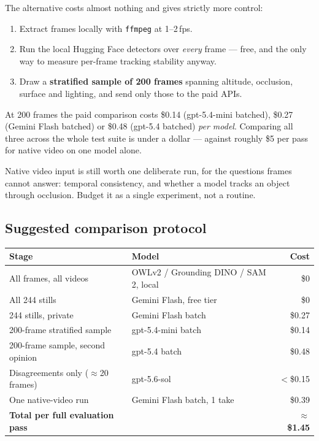 \documentclass[11pt,a4paper]{article}
\begin{document}
The alternative costs almost nothing and gives strictly more control:

\begin{enumerate}[leftmargin=*,itemsep=1pt]
\item Extract frames locally with \texttt{ffmpeg} at 1--2\,fps.
\item Run the local Hugging Face detectors over \emph{every} frame --- free, and
the only way to measure per-frame tracking stability anyway.
\item Draw a \textbf{stratified sample of 200 frames} spanning altitude,
occlusion, surface and lighting, and send only those to the paid APIs.
\end{enumerate}

\noindent At 200 frames the paid comparison costs \$0.14 (gpt-5.4-mini batched),
\$0.27 (Gemini Flash batched) or \$0.48 (gpt-5.4 batched) \emph{per model}.
Comparing all three across the whole test suite is under a dollar --- against
roughly \$5 per pass for native video on one model alone.

Native video input is still worth one deliberate run, for the questions frames
cannot answer: temporal consistency, and whether a model tracks an object
through occlusion. Budget it as a single experiment, not a routine.

\subsection{Suggested comparison protocol}

\begin{center}
\begin{tabular}{llr}
\toprule
\textbf{Stage} & \textbf{Model} & \textbf{Cost} \\
\midrule
All frames, all videos & OWLv2 / Grounding DINO / SAM 2, local & \$0 \\
All 244 stills & Gemini Flash, free tier & \$0 \\
244 stills, private & Gemini Flash batch & \$0.27 \\
200-frame stratified sample & gpt-5.4-mini batch & \$0.14 \\
200-frame sample, second opinion & gpt-5.4 batch & \$0.48 \\
Disagreements only ($\approx$20 frames) & gpt-5.6-sol & $<$\$0.15 \\
One native-video run & Gemini Flash batch, 1 take & \$0.39 \\
\midrule
\textbf{Total per full evaluation pass} & & \textbf{$\approx$\$1.45} \\
\bottomrule
\end{tabular}
\end{center}
\end{document}
